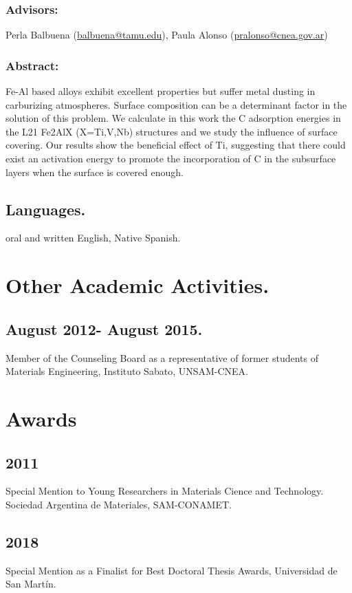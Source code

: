 \documentclass{my_cv}
\begin{document}
\subsubsection{Advisors:} Perla Balbuena (\url{balbuena@tamu.edu}), Paula Alonso (\url{pralonso@cnea.gov.ar})
\subsubsection{Abstract:} Fe-Al based alloys exhibit excellent properties but suffer metal dusting in
carburizing atmospheres. Surface composition can be a determinant factor in the solution
of this problem. We calculate in this work the C adsorption energies in the L21 Fe2AlX
(X=Ti,V,Nb) structures and we study the influence of surface covering. Our results show
the beneficial effect of Ti, suggesting that there could exist an activation energy to promote
the incorporation of C in the subsurface layers when the surface is covered enough.
\subsection{Languages.} oral and written English, Native Spanish.

\section{Other Academic Activities.}

\subsection{August 2012- August 2015.} Member of the Counseling Board as a representative of
former students of Materials Engineering, Instituto Sabato, UNSAM-CNEA.

\section{Awards}

\subsection{2011} Special Mention to Young Researchers in Materials Cience and Technology. Sociedad
Argentina de Materiales, SAM-CONAMET.

\subsection{2018} Special Mention as a Finalist for Best Doctoral Thesis Awards, Universidad de San
Martín. 
\end{document}
